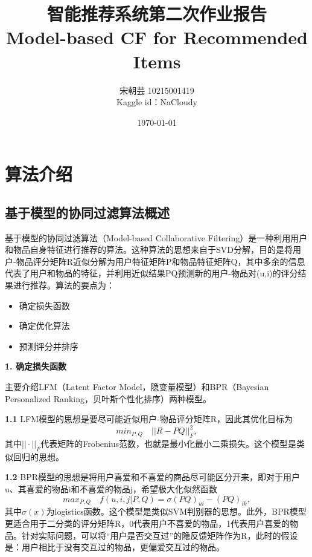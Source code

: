 \documentclass[12pt, a4paper]{ctexart}
\title{\textbf{智能推荐系统第二次作业报告}\\
Model-based CF for Recommended Items}
\author{宋朝芸 10215001419\\Kaggle id：NaCloudy}
\date{\today}
\begin{document}
\maketitle

\setcounter{page}{0}
\maketitle
\thispagestyle{empty}


\setcounter{page}{1}
\tableofcontents
\newpage
\setcounter{page}{1}

\section{算法介绍}

\subsection{基于模型的协同过滤算法概述}


基于模型的协同过滤算法（Model-based Collaborative Filtering）是一种利用用户和物品自身特征进行推荐的算法。这种算法的思想来自于SVD分解，目的是将用户-物品评分矩阵R近似分解为用户特征矩阵P和物品特征矩阵Q，其中多余的信息代表了用户和物品的特征，并利用近似结果PQ预测新的用户-物品对(u,i)的评分结果进行推荐。算法的要点为：
\begin{itemize}
    \item 确定损失函数
    \item 确定优化算法
    \item 预测评分并排序
\end{itemize}


\textbf{1. 确定损失函数}

主要介绍LFM（Latent Factor Model，隐变量模型）和BPR（Bayesian Personalized Ranking，贝叶斯个性化排序）两种模型。

\textbf{1.1} LFM模型的思想是要尽可能近似用户-物品评分矩阵R，因此其优化目标为
$$
min_{P,Q}\quad ||R-PQ||_F^2,
$$
其中$||·||_F$代表矩阵的Frobenius范数，也就是最小化最小二乘损失。这个模型是类似回归的思想。

\textbf{1.2} BPR模型的思想是将用户喜爱和不喜爱的商品尽可能区分开来，即对于用户u、其喜爱的物品i和不喜爱的物品j，希望极大化似然函数
$$
max_{P,Q}\quad f(u,i,j|P,Q)=\sigma{(PQ)_{ui}-(PQ)_{ik}},
$$
其中$\sigma(x)$为logistics函数。这个模型是类似SVM判别器的思想。此外，BPR模型更适合用于二分类的评分矩阵R，0代表用户不喜爱的物品，1代表用户喜爱的物品。针对实际问题，可以将“用户是否交互过”的隐反馈矩阵作为R，此时的假设是：用户相比于没有交互过的物品，更偏爱交互过的物品。
\end{document}
